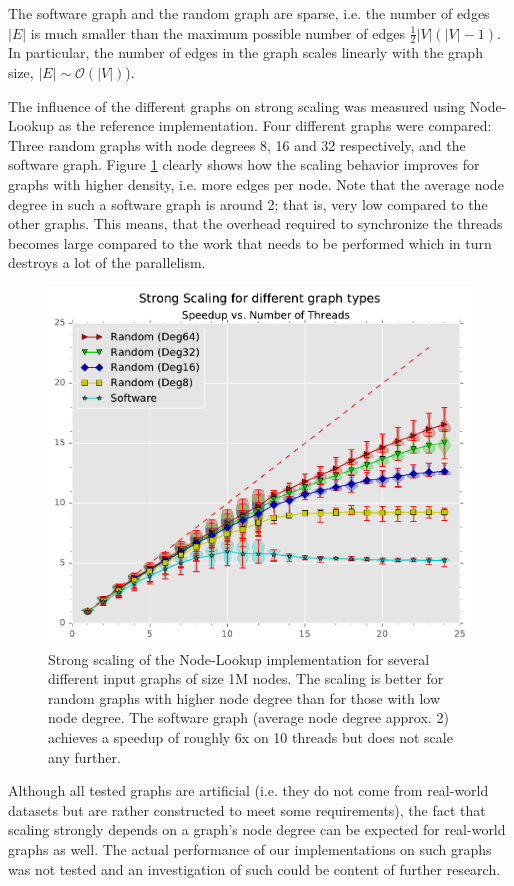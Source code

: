 The software graph and the random graph are sparse, i.e. the number of edges $|E|$ is much smaller than the maximum possible number of edges $\tfrac{1}{2}|V|(|V|-1)$.
In particular, the number of edges in the graph scales linearly with the graph size, $|E| \sim \mathcal{O} ( |V| )$).

The influence of the different graphs on strong scaling was measured using Node-Lookup as the reference implementation.
Four different graphs were compared: Three random graphs with node degrees 8, 16 and 32 respectively, and the software graph.
Figure \ref{fig:strongscaling_graphtypes} clearly shows how the scaling behavior improves for graphs with higher density, i.e. more edges per node.
Note that the average node degree in such a software graph is around 2; that is, very low compared to the other graphs.
This means, that the overhead required to synchronize the threads becomes large compared to the work that needs to be performed which in turn destroys a lot of the parallelism.

%
\begin{figure}[ht]
        \centering
        \includegraphics[width=\columnwidth]{plots/strongscaling_gtALL_n1000000_multicolor.pdf}
        \caption{Strong scaling of the Node-Lookup implementation for several different input graphs of size 1M nodes. The scaling is better for random graphs with higher node degree than for those with low node degree.
                The software graph (average node degree approx. 2) achieves a speedup of roughly 6x on 10 threads but does not scale any further.
}
        \label{fig:strongscaling_graphtypes}
\end{figure}
%

Although all tested graphs are artificial (i.e. they do not come from real-world datasets but are rather constructed to meet some requirements),
the fact that scaling strongly depends on a graph's node degree can be expected for real-world graphs as well.
The actual performance of our implementations on such graphs was not tested and an investigation of such could be content of further research.